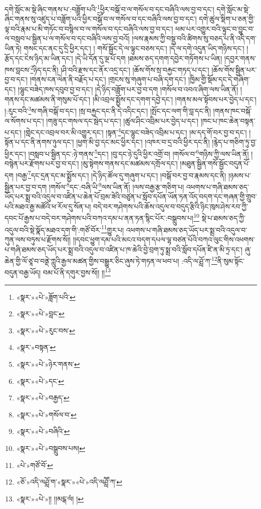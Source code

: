 དགེ་སློང་མ་སྡེ་ཞིང་གནས་པ་:བཟློག་པའི་\footnote{«སྣར་»«པེ་»ཟློག་པའི་}ཕྱིར་བསྒོ་བ་ལ་གསོལ་བ་དང་བཞིའི་ལས་བྱ་བ་དང་། དགེ་སློང་མ་སྡེ་ཞིང་གནས་སུ་འཛུད་པ་བཟློག་པའི་ཕྱིར་བསྒོ་བ་ལ་གསོལ་བ་དང་བཞིའི་ལས་བྱ་བ་དང་། དགེ་ཚུལ་སྡིག་པ་ཅན་གྱི་ལྟ་བའི་རྣམ་པ་མི་གཏོང་བ་བསྙིལ་བ་ལ་གསོལ་བ་དང་བཞིའི་ལས་བྱ་བ་དང་། ཕམ་པར་འགྱུར་བའི་ལྟུང་བ་བྱུང་བ་ལ་བསླབ་པ་སྦྱིན་པ་ལ་གསོལ་བ་དང་བཞིའི་ལས་བྱ་བའོ། །ལས་རྣམས་ཀྱི་བསྡུ་བའི་ཚིགས་སུ་བཅད་པ་ནི་འདི་དག་ཡིན་ཏེ། གསང་དང་ནང་དུ་དྲི་ཕྱིར་དང་། །
གསོ་སྦྱོང་དེ་ལ་ལྟུང་བཅས་དང་། །དེ་ལ་དགེ་འདུན་ཡིད་གཉིས་དང་། །རྩོད་དང་ངེས་ཉིད་མ་ཡིན་དང་། །དེ་ཡི་དོན་དུ་ལྔ་པོ་དག །ཐམས་ཅད་དགག་དབྱེར་གཏོགས་པ་ཡིན། །དབྱར་གནས་ཁས་བླངས་\footnote{«སྣར་»«པེ་»བླང་}ཉིད་དང་ནི། །ཤི་བའི་རྫས་དང་ནོར་འདྲ་དང་། །ཆོས་གོས་སྲ་བརྐྱང་གཏད་པ་དང་། །ཆོས་གོས་སྦྱིན་པར་བྱ་བ་དང་། །གནས་ངན་ལེན་ནི་བརྗོད་པ་དང་། །གྲངས་སུ་གཞུག་པ་བཞི་དག་དང་། །ཁྱིམ་གྱི་སྡོམ་དང་དེ་གཞིག་དང་། །ལྷུང་བཟེད་ཁས་དབུབ་བྱ་བ་དང་། །དེ་ཉིད་བཟློག་པར་བྱ་བ་དག །གསོལ་བ་འབའ་ཞིག་ལས་ཡིན་ནོ། །གནས་དང་མཚམས་ནི་གསུམ་པོ་དང་། །མི་འབྲལ་སྨྱོས་དང་དགག་དབྱེ་དང་། །གནས་མལ་སྟོབས་པར་བྱེད་པ་དང་། །:རུང་བའི་\footnote{«སྣར་»«པེ་»རུང་བས་}ས་གཞི་བསྒོ་བ་དང་། །སྲ་བརྐྱང་དང་ནི་དེ་འདིང་དང་། །སྤོང་དང་ལག་གི་བླ་དང་ནི། །གནས་ཁང་བསྐོ་ལ་སོགས་པ་དང་། །གཟུ་དང་གསལ་དང་སྦེད་པ་དང་། །ཚུལ་ཤིང་འབྲིམ་པར་བྱེད་པ་དང་། །ཁང་པ་ཁང་ཆེན་བསྟན་པ་དང་། །གླེང་དང་འབྲལ་བར་མི་འགྱུར་དང་། །སྟན་\footnote{«སྣར་»བསྟན་}དང་ལྷུང་བཟེད་འབྲིམ་པ་དང་། །མ་དད་གོ་བར་བྱ་བ་དང་། །སྟོན་པ་དང་ནི་ནགས་ཉུལ་དང་། །ཕྱག་མི་བྱ་དང་མང་ཕྱིར་དང་། །འཁར་བ་དྲ་བའི་ཕྱིར་དང་ནི། །རྙེད་པ་གཅིག་ཏུ་བྱ་ཕྱིར་དང་། །བསླབ་པ་སྦྱིན་དང་:ཉེ་གནས་\footnote{«སྣར་»«པེ་»ཉེར་གནས་}དང་། །བུ་དང་ཉེ་དུའི་ཕྱིར་འགྲོ་བ། །གསོལ་བ་\footnote{«སྣར་»«པེ་»དང་}གཉིས་ཀྱི་ལས་ཡིན་ནོ། །བསྙེན་པར་རྫོགས་པར་བྱ་བ་དང་། །མུ་སྟེགས་གནས་དང་མཚམས་དགྲོལ་དང་། །མཐུན་སྦྱིན་གསོ་སྦྱོང་བདུན་པོ་དག །བརྒྱ་\footnote{«སྣར་»«པེ་»བརྒྱད་}དང་དྲན་དང་མ་སྨྱོས་དང་། །དེ་ཉིད་ཚོལ་དུ་གཞུག་པ་དང་། །བསྒོ་བར་བྱ་བ་རྣམས་དང་ནི། །ཉམས་པ་སྦྱིན་པར་བྱ་བ་དག །གསོལ་\footnote{«སྣར་»«པེ་»གསོལ་བ་}དང་:བཞི་ཡི་\footnote{«སྣར་»«པེ་»བཞིའི་}ལས་ཡིན་ནོ། །ལས་བརྒྱ་རྩ་གཅིག་པ། འཕགས་པ་གཞི་ཐམས་ཅད་ཡོད་པར་སྨྲ་བའི་འདུལ་བ་འཛིན་པ་ཆེན་པོ་བྲམ་ཟེའི་བཙུན་པ་སློབ་དཔོན་ཡོན་ཏན་འོད་བདག་དང་གཞན་གྱི་གྲུབ་པའི་མཐའ་རྒྱ་མཚོའི་ཕ་རོལ་དུ་སོན་པ། བདེ་བར་གཤེགས་པའི་ཆོས་འདུལ་བ་བདུད་རྩིའི་ཉིང་ཁུས་ཤེས་རབ་ཀྱི་དབང་པོ་རྒྱས་པ་བདེ་བར་གཤེགས་པའི་བཀའ་དམ་པ་ནན་ཏན་སྙིང་པོར་:བསྒྲུབས་པ།\footnote{«སྣར་»«པེ་»བསྒྲུབས་པས།} སྡེ་པ་ཐམས་ཅད་ཀྱི་འདུལ་བའི་སྡེ་སྣོད་མཐའ་དག་གི་:གཙོ་བོར་\footnote{«པེ་»གཙོ་བོ་}གྱུར་པ། འཕགས་པ་གཞི་ཐམས་ཅད་ཡོད་པར་སྨྲ་བའི་འདུལ་བ་ཀུན་ལས་བཏུས་པ་རྫོགས་སོ།། །།དབང་ཕྱུག་དམ་པའི་མངའ་བདག་དཔལ་ལྷ་བཙན་པོའི་བཀའ་ལུང་གིས་འཕགས་པ་གཞི་ཐམས་ཅད་ཡོད་པར་སྨྲ་བའི་འདུལ་བ་འཛིན་པ་ཁ་ཆེའི་བྱེ་བྲག་ཏུ་སྨྲ་བའི་སློབ་དཔོན་ཛི་ན་མི་ཏྲ་དང་། ཞུ་ཆེན་གྱི་ལོ་ཙཱ་བ་བནྡེ་ཀླུའི་རྒྱལ་མཚན་གྱིས་བསྒྱུར་ཅིང་ཞུས་ཏེ་གཏན་ལ་ཕབ་པ། :འདི་ལ་ཤློ་ཀ་\footnote{«ཅོ་»འདི་ལཤློ་ག་«སྣར་»«པེ་»འདི་ལཤླཽ་ཀ་}ནི་སུམ་སྟོང་བདུན་བརྒྱ་ཡོད། བམ་པོ་ནི་དགུར་བྱས་སོ།། །།\footnote{«སྣར་»«པེ་»།། །།མངྒ་ལཾ། །}